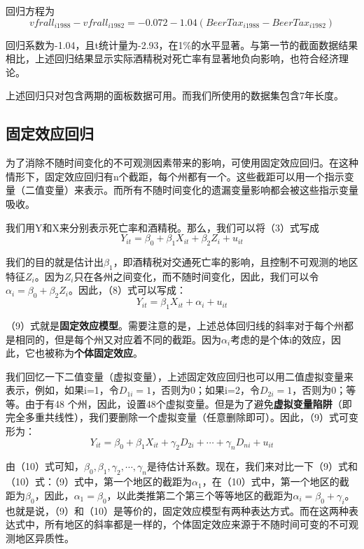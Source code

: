\documentclass[cn,10pt,math=newtx,citestyle=gb7714-2015,bibstyle=gb7714-2015]{elegantbook}
\begin{document}
回归方程为
\begin{equation}
	vfrall_{i1988}-vfrall_{i1982}=-0.072-1.04(BeerTax_{i1988}-BeerTax_{i1982})
\end{equation}

回归系数为-1.04，且t统计量为-2.93，在1\%的水平显著。与第一节的截面数据结果相比，上述回归结果显示实际酒精税对死亡率有显著地负向影响，也符合经济理论。

上述回归只对包含两期的面板数据可用。而我们所使用的数据集包含7年长度。

\subsection{固定效应回归}

为了消除不随时间变化的不可观测因素带来的影响，可使用固定效应回归。在这种情形下，固定效应回归有n个截距，每个州都有一个。这些截距可以用一个指示变量（二值变量）来表示。而所有不随时间变化的遗漏变量影响都会被这些指示变量吸收。

我们用Y和X来分别表示死亡率和酒精税。那么，我们可以将（3）式写成
\begin{equation}
	Y_{it}=\beta_{0}+\beta_{1}X_{it}+\beta_{2}Z_i+u_{it}
\end{equation}

我们的目的就是估计出$\beta_1$，即酒精税对交通死亡率的影响，且控制不可观测的地区特征$Z_i$。因为$Z_i$只在各州之间变化，而不随时间变化，因此，我们可以令$\alpha_i=\beta_0+\beta_{2}Z_i$。因此，（8）式可以写成：
\begin{equation}
	Y_{it}=\beta_{1}X_{it}+\alpha_i+u_{it}
\end{equation}

（9）式就是\textbf{固定效应模型}。需要注意的是，上述总体回归线的斜率对于每个州都是相同的，但是每个州又对应着不同的截距。因为$\alpha_i$考虑的是个体i的效应，因此，它也被称为\textbf{个体固定效应}。

我们回忆一下二值变量（虚拟变量），上述固定效应回归也可以用二值虚拟变量来表示，例如，如果i=1，令$D_{1i}=1$，否则为0；如果i=2，令$D_{2i}=1$，否则为0；等等。由于有48 个州，因此，设置48个虚拟变量。但是为了避免\textbf{虚拟变量陷阱}（即完全多重共线性），我们要删除一个虚拟变量（任意删除即可）。因此，（9）式可变形为：
\begin{equation}
	Y_{it}=\beta_{0}+\beta_{1}X_{it}+\gamma_2D_{2i}+\cdots+\gamma_nD_{ni}+u_{it}
\end{equation}

由（10）式可知，$\beta_0,\beta_1,\gamma_2,\cdots,\gamma_n$是待估计系数。现在，我们来对比一下（9）式和（10）式：（9）式中，第一个地区的截距为$\alpha_1$，在（10）式中，第一个地区的截距为$\beta_{0}$，因此，$\alpha_1=\beta_{0}$，以此类推第二个第三个等等地区的截距为$\alpha_i=\beta_0+\gamma_i$。也就是说，（9）和（10）是等价的，固定效应模型有两种表达方式。而在这两种表达式中，所有地区的斜率都是一样的，个体固定效应来源于不随时间可变的不可观测地区异质性。
\end{document}

